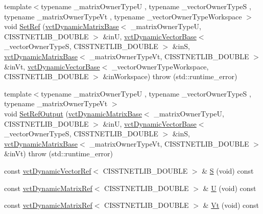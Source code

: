 \begin{DoxyCompactItemize}
{\footnotesize template$<$typename \+\_\+matrix\+Owner\+Type\+U , typename \+\_\+vector\+Owner\+Type\+S , typename \+\_\+matrix\+Owner\+Type\+Vt , typename \+\_\+vector\+Owner\+Type\+Workspace $>$ }\\void \hyperlink{classnmr_s_v_d_economy_dynamic_data_a6a565c76dcc2d1b5440d8deff372d2bc}{Set\+Ref} (\hyperlink{classvct_dynamic_matrix_base}{vct\+Dynamic\+Matrix\+Base}$<$ \+\_\+matrix\+Owner\+Type\+U, C\+I\+S\+S\+T\+N\+E\+T\+L\+I\+B\+\_\+\+D\+O\+U\+B\+L\+E $>$ \&in\+U, \hyperlink{classvct_dynamic_vector_base}{vct\+Dynamic\+Vector\+Base}$<$ \+\_\+vector\+Owner\+Type\+S, C\+I\+S\+S\+T\+N\+E\+T\+L\+I\+B\+\_\+\+D\+O\+U\+B\+L\+E $>$ \&in\+S, \hyperlink{classvct_dynamic_matrix_base}{vct\+Dynamic\+Matrix\+Base}$<$ \+\_\+matrix\+Owner\+Type\+Vt, C\+I\+S\+S\+T\+N\+E\+T\+L\+I\+B\+\_\+\+D\+O\+U\+B\+L\+E $>$ \&in\+Vt, \hyperlink{classvct_dynamic_vector_base}{vct\+Dynamic\+Vector\+Base}$<$ \+\_\+vector\+Owner\+Type\+Workspace, C\+I\+S\+S\+T\+N\+E\+T\+L\+I\+B\+\_\+\+D\+O\+U\+B\+L\+E $>$ \&in\+Workspace)  throw (std\+::runtime\+\_\+error)
\item 
{\footnotesize template$<$typename \+\_\+matrix\+Owner\+Type\+U , typename \+\_\+vector\+Owner\+Type\+S , typename \+\_\+matrix\+Owner\+Type\+Vt $>$ }\\void \hyperlink{classnmr_s_v_d_economy_dynamic_data_a006e07c4a0b8c0dcd2c1ab85d588a139}{Set\+Ref\+Output} (\hyperlink{classvct_dynamic_matrix_base}{vct\+Dynamic\+Matrix\+Base}$<$ \+\_\+matrix\+Owner\+Type\+U, C\+I\+S\+S\+T\+N\+E\+T\+L\+I\+B\+\_\+\+D\+O\+U\+B\+L\+E $>$ \&in\+U, \hyperlink{classvct_dynamic_vector_base}{vct\+Dynamic\+Vector\+Base}$<$ \+\_\+vector\+Owner\+Type\+S, C\+I\+S\+S\+T\+N\+E\+T\+L\+I\+B\+\_\+\+D\+O\+U\+B\+L\+E $>$ \&in\+S, \hyperlink{classvct_dynamic_matrix_base}{vct\+Dynamic\+Matrix\+Base}$<$ \+\_\+matrix\+Owner\+Type\+Vt, C\+I\+S\+S\+T\+N\+E\+T\+L\+I\+B\+\_\+\+D\+O\+U\+B\+L\+E $>$ \&in\+Vt)  throw (std\+::runtime\+\_\+error)
\item 
const \hyperlink{classvct_dynamic_vector_ref}{vct\+Dynamic\+Vector\+Ref}$<$ C\+I\+S\+S\+T\+N\+E\+T\+L\+I\+B\+\_\+\+D\+O\+U\+B\+L\+E $>$ \& \hyperlink{classnmr_s_v_d_economy_dynamic_data_a5326180f759203b44165d655dd9c7cc3}{S} (void) const 
\item 
const \hyperlink{classvct_dynamic_matrix_ref}{vct\+Dynamic\+Matrix\+Ref}$<$ C\+I\+S\+S\+T\+N\+E\+T\+L\+I\+B\+\_\+\+D\+O\+U\+B\+L\+E $>$ \& \hyperlink{classnmr_s_v_d_economy_dynamic_data_a9e9211a54443d529c82a2c1f8161934f}{U} (void) const 
\item 
const \hyperlink{classvct_dynamic_matrix_ref}{vct\+Dynamic\+Matrix\+Ref}$<$ C\+I\+S\+S\+T\+N\+E\+T\+L\+I\+B\+\_\+\+D\+O\+U\+B\+L\+E $>$ \& \hyperlink{classnmr_s_v_d_economy_dynamic_data_a191e18293e746bb00deec285c1bb39f8}{Vt} (void) const 
\end{DoxyCompactItemize}

